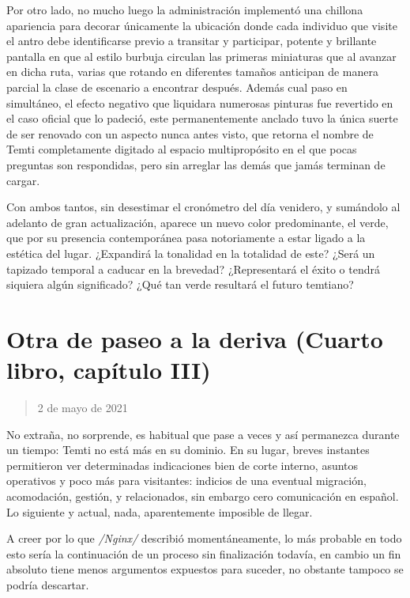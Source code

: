 \documentclass[
]{book}
\begin{document}
Por otro lado, no mucho luego la administración implementó una chillona apariencia para decorar únicamente la ubicación donde cada individuo que visite el antro debe identificarse previo a transitar y participar, potente y brillante pantalla en que al estilo burbuja circulan las primeras miniaturas que al avanzar en dicha ruta, varias que rotando en diferentes tamaños anticipan de manera parcial la clase de escenario a encontrar después. Además cual paso en simultáneo, el efecto negativo que liquidara numerosas pinturas fue revertido en el caso oficial que lo padeció, este permanentemente anclado tuvo la única suerte de ser renovado con un aspecto nunca antes visto, que retorna el nombre de Temti completamente digitado al espacio multipropósito en el que pocas preguntas son respondidas, pero sin arreglar las demás que jamás terminan de cargar.

Con ambos tantos, sin desestimar el cronómetro del día venidero, y sumándolo al adelanto de gran actualización, aparece un nuevo color predominante, el verde, que por su presencia contemporánea pasa notoriamente a estar ligado a la estética del lugar. ¿Expandirá la tonalidad en la totalidad de este? ¿Será un tapizado temporal a caducar en la brevedad? ¿Representará el éxito o tendrá siquiera algún significado? ¿Qué tan verde resultará el futuro temtiano?

\hypertarget{otra-de-paseo-a-la-deriva-cuarto-libro-capuxedtulo-iii}{%
\section{Otra de paseo a la deriva (Cuarto libro, capítulo III)}\label{otra-de-paseo-a-la-deriva-cuarto-libro-capuxedtulo-iii}}

\begin{quote}
2 de mayo de 2021
\end{quote}

No extraña, no sorprende, es habitual que pase a veces y así permanezca durante un tiempo: Temti no está más en su dominio. En su lugar, breves instantes permitieron ver determinadas indicaciones bien de corte interno, asuntos operativos y poco más para visitantes: indicios de una eventual migración, acomodación, gestión, y relacionados, sin embargo cero comunicación en español. Lo siguiente y actual, nada, aparentemente imposible de llegar.

A creer por lo que \emph{/Nginx/} describió momentáneamente, lo más probable en todo esto sería la continuación de un proceso sin finalización todavía, en cambio un fin absoluto tiene menos argumentos expuestos para suceder, no obstante tampoco se podría descartar.
\end{document}
